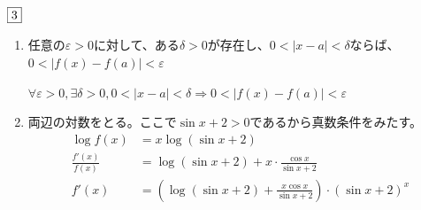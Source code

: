 \documentclass[dvipdfmx]{jsreport}
\renewcommand{\epsilon}{\varepsilon} %
\newcounter{num}[section]
\begin{document}
\begin{answer} %
	$\fbox{3}$
\begin{enumerate}
	\item 任意の$\epsilon> 0$に対して、ある$\delta> 0$が存在し、$	0< |x- a|< \delta$ならば、$0< |f(x)- f(a)|< \epsilon$
\begin{tcolorbox}[title= 論理記号ver.]
	$\forall \epsilon>0, \exists \delta> 0, 0< |x- a|< \delta \Longrightarrow 0< |f(x)- f(a)|< \epsilon$
\end{tcolorbox}

	\item 両辺の対数をとる。ここで$\sin{x}+ 2> 0$であるから真数条件をみたす。
\begin{align*}
	\log{f(x)}&= x\log{(\sin{x}+ 2)}\\
	\frac{f'(x)}{f(x)}&= \log{(\sin{x}+ 2)}+ x\cdot \frac{\cos{x}}{\sin{x}+ 2}\\
	f'(x)&= \left(\log{(\sin{x}+ 2)}+ \frac{x\cos{x}}{\sin{x}+ 2}\right)\cdot(\sin{x}+ 2)^x
\end{align*}


\end{enumerate}
\end{answer}
\end{document}
